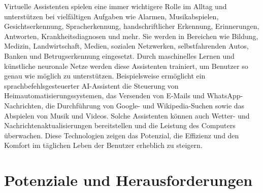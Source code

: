 \documentclass[conference]{IEEEtran}
\begin{document}
Virtuelle Assistenten spielen eine immer wichtigere Rolle im Alltag und unterstützen bei vielfältigen Aufgaben wie Alarmen, Musikabspielen, Gesichtserkennung, Spracherkennung, handschriftlicher Erkennung, Erinnerungen, Antworten, Krankheitsdiagnosen und mehr. Sie werden in Bereichen wie Bildung, Medizin, Landwirtschaft, Medien, sozialen Netzwerken, selbstfahrenden Autos, Banken und Betrugserkennung eingesetzt. Durch maschinelles Lernen und künstliche neuronale Netze werden diese Assistenten trainiert, um Benutzer so genau wie möglich zu unterstützen. Beispielsweise ermöglicht ein sprachbefehlsgesteuerter AI-Assistent die Steuerung von Heimautomatisierungssystemen, das Versenden von E-Mails und WhatsApp-Nachrichten, die Durchführung von Google- und Wikipedia-Suchen sowie das Abspielen von Musik und Videos. Solche Assistenten können auch Wetter- und Nachrichtenaktualisierungen bereitstellen und die Leistung des Computers überwachen. Diese Technologien zeigen das Potenzial, die Effizienz und den Komfort im täglichen Leben der Benutzer erheblich zu steigern\cite{charan_home_2023}.

\section{Potenziale und Herausforderungen}
\end{document}
